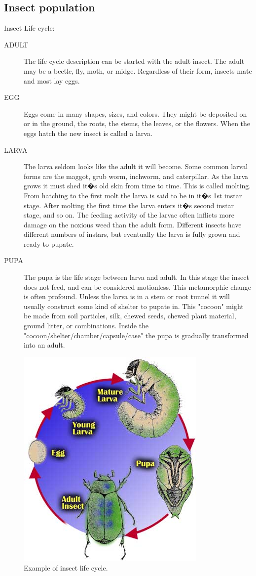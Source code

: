 \subsection{Insect population}
Insect Life cycle:
\begin{description}
\item[ADULT] 
The life cycle description can be started with the adult insect. The adult may be a beetle, fly, moth, or midge. Regardless of their form, insects mate and most lay eggs.
\item[EGG] 
Eggs come in many shapes, sizes, and colors. They might be deposited on or in the ground, the roots, the stems, the leaves, or the flowers. When the eggs hatch the new insect is called a larva. 
\item[LARVA]
The larva seldom looks like the adult it will become. Some common larval forms are the maggot, grub worm, inchworm, and caterpillar. As the larva grows it must shed it�s old skin from time to time. This is called molting. From hatching to the first molt the larva is said to be in it�s 1st instar stage. After molting the first time the larva enters it�s second instar stage, and so on. The feeding activity of the larvae often inflicts more damage on the noxious weed than the adult form. Different insects have different numbers of instars, but eventually the larva is fully grown and ready to pupate.
\item[PUPA] 
The pupa is the life stage between larva and adult. In this stage the insect does not feed, and can be considered motionless. This metamorphic change is often profound. Unless the larva is in a stem or root tunnel it will usually construct some kind of shelter to pupate in. This "cocoon" might be made from soil particles, silk, chewed seeds, chewed plant material, ground litter, or combinations.
Inside the "cocoon/shelter/chamber/capsule/case" the pupa is gradually transformed into an adult.
\end{description}
\begin{figure}
\begin{center}
\includegraphics[width=.4\textwidth]{figs_steph/insect_life_cycle}
\caption{Example of insect life cycle.}
\end{center}
\end{figure}



